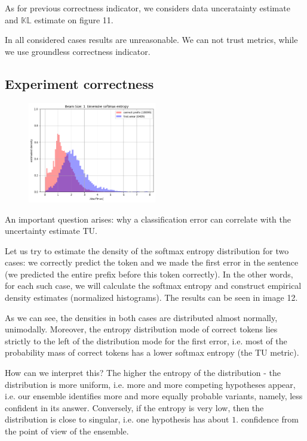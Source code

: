 \documentclass[a4paper,14pt]{extarticle}
\begin{document}
	As for previous correctness indicator, we considers data unceratainty estimate and $\mathbb{KL}$ estimate on figure 11.
	
	In all considered cases results are unreasonable. We can not trust metrics, while we use groundless correctness indicator.
	
\subsection{Experiment correctness}
	\begin{figure}
		\includegraphics[width=0.5\textwidth]{images/ens_entropy.png}
	\end{figure}
	
	An important question arises: why a classification error can correlate with the uncertainty estimate TU.
	
	Let us try to estimate the density of the softmax entropy distribution for two cases: we correctly predict the token and we made the first error in the sentence (we predicted the entire prefix before this token correctly). In the other words, for each such case, we will calculate the softmax entropy and construct empirical density estimates (normalized histograms). The results can be seen in image 12.

	As we can see, the densities in both cases are distributed almost normally, unimodally. Moreover, the entropy distribution mode of correct tokens lies strictly to the left of the distribution mode for the first error, i.e. most of the probability mass of correct tokens has a lower softmax entropy (the TU metric).

	How can we interpret this? The higher the entropy of the distribution - the distribution is more uniform, i.e. more and more competing hypotheses appear, i.e. our ensemble identifies more and more equally probable variants, namely, less confident in its answer. Conversely, if the entropy is very low, then the distribution is close to singular, i.e. one hypothesis has about $1.$ confidence from the point of view of the ensemble.
\end{document}
